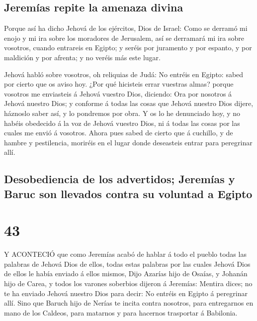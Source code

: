 \hypertarget{jeremuxedas-repite-la-amenaza-divina}{%
\subsection{Jeremías repite la amenaza
divina}\label{jeremuxedas-repite-la-amenaza-divina}}

 Porque así ha dicho Jehová de los ejércitos, Dios de
Israel: Como se derramó mi enojo y mi ira sobre los moradores de
Jerusalem, así se derramará mi ira sobre vosotros, cuando entrareis en
Egipto; y seréis por juramento y por espanto, y por maldición y por
afrenta; y no veréis más este lugar.

 Jehová habló sobre vosotros, oh reliquias de Judá: No
entréis en Egipto: sabed por cierto que os aviso hoy.  ¿Por
qué hicisteis errar vuestras almas? porque vosotros me enviasteis á
Jehová vuestro Dios, diciendo: Ora por nosotros á Jehová nuestro Dios; y
conforme á todas las cosas que Jehová nuestro Dios dijere, háznoslo
saber así, y lo pondremos por obra.  Y os lo he denunciado
hoy, y no habéis obedecido á la voz de Jehová vuestro Dios, ni á todas
las cosas por las cuales me envió á vosotros.  Ahora pues
sabed de cierto que á cuchillo, y de hambre y pestilencia, moriréis en
el lugar donde deseasteis entrar para peregrinar allí.

\hypertarget{desobediencia-de-los-advertidos-jeremuxedas-y-baruc-son-llevados-contra-su-voluntad-a-egipto}{%
\subsection{Desobediencia de los advertidos; Jeremías y Baruc son
llevados contra su voluntad a
Egipto}\label{desobediencia-de-los-advertidos-jeremuxedas-y-baruc-son-llevados-contra-su-voluntad-a-egipto}}

\hypertarget{section-42}{%
\section{43}\label{section-42}}

 Y ACONTECIÓ que como Jeremías acabó de hablar á todo el
pueblo todas las palabras de Jehová Dios de ellos, todas estas palabras
por las cuales Jehová Dios de ellos le había enviado á ellos mismos,
 Dijo Azarías hijo de Osaías, y Johanán hijo de Carea, y
todos los varones soberbios dijeron á Jeremías: Mentira dices; no te ha
enviado Jehová nuestro Dios para decir: No entréis en Egipto á
peregrinar allí.  Sino que Baruch hijo de Nerías te incita
contra nosotros, para entregarnos en mano de los Caldeos, para matarnos
y para hacernos trasportar á Babilonia.

